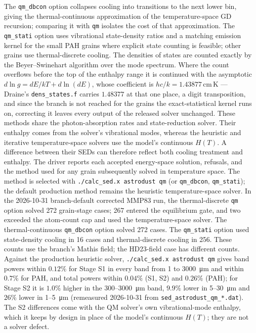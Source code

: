 \documentclass{my_memo}
\begin{document}
The \texttt{qm\_dbcon} option collapses cooling into transitions to the
next lower bin, giving the thermal-continuous approximation of the
temperature-space GD recursion; comparing it with \texttt{qm} isolates
the cost of that approximation. The
\texttt{qm\_stati} option uses vibrational state-density ratios and a
matching emission kernel for the small PAH grains where explicit state
counting is feasible; other grains use thermal-discrete cooling. The
densities of states are counted exactly by the Beyer--Swinehart
algorithm over the mode spectrum. Where the count overflows before the
top of the enthalpy range it is continued with the asymptotic
$d\ln g = dE/kT + d\ln(dE)$, whose coefficient is
$hc/k = 1.43877$\,cm\,K --- Draine's \texttt{dens\_states.f} carries
$1.48377$ at that one place, a digit transposition, and since the
branch is not reached for the grains the exact-statistical kernel runs
on, correcting it leaves every output of the released solver
unchanged. These
methods share the photon-absorption rates and state-reduction solver.
Their enthalpy comes from the solver's vibrational modes, whereas the
heuristic and iterative temperature-space solvers use the model's
continuous $H(T)$. A difference between their SEDs can therefore
reflect both cooling treatment and enthalpy. The driver reports each
accepted energy-space solution, refusals, and the method used for any
grain subsequently solved in temperature space. The method is selected
with \texttt{./calc\_sed.x astrodust qm} (or \texttt{qm\_dbcon},
\texttt{qm\_stati}); the default production method remains the
heuristic temperature-space solver. In the
2026-10-31 branch-default corrected MMP83 run, the thermal-discrete
\texttt{qm} option solved 272 grain-stage cases; 267 entered the
equilibrium gate, and two exceeded the atom-count cap and used the
temperature-space solver. The thermal-continuous \texttt{qm\_dbcon}
option solved 272 cases. The \texttt{qm\_stati} option used state-density
cooling in 16 cases and thermal-discrete cooling in 256. These counts
use the branch's Mathis field; the HD23-field case has different counts.
Against the production heuristic solver, \texttt{./calc\_sed.x
astrodust qm} gives band powers within $0.12\%$ for Stage S1 in every
band from 1 to \SI{3000}{\micro\meter} and within $0.7\%$ for PAH, and
total powers within $0.04\%$ (S1, S2) and $0.26\%$ (PAH); for Stage S2
it is $1.0\%$ higher in the 300--\SI{3000}{\micro\meter} band, $9.9\%$
lower in 5--\SI{30}{\micro\meter} and $26\%$ lower in
1--\SI{5}{\micro\meter} (remeasured 2026-10-31 from
\texttt{sed\_astrodust\_qm\_*.dat}). The S2 differences come with the
QM solver's own vibrational-mode enthalpy, which it keeps by design in
place of the model's continuous $H(T)$; they are not a solver defect.
\end{document}
